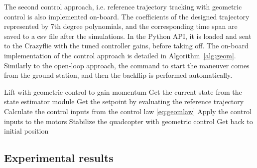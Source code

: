 The second control approach, i.e. reference trajectory tracking with geometric control is also implemented on-board. The coefficients of the designed trajectory represented by 7th degree polynomials, and the corresponding time span are saved to a csv file after the simulations. In the Python API, it is loaded and sent to the Crazyflie with the tuned controller gains, before taking off. The on-board implementation of the control approach is detailed in Algorithm~\ref{alg:geom}. Similarly to the open-loop approach, the command to start the maneuver comes from the ground station, and then the backflip is performed automatically.
\begin{algorithm}
  \cprotect\caption{\verb+performGeomFlip+ on-board implementation}
  \label{alg:geom}
  \begin{algorithmic}[1]
    \State Lift with geometric control to gain momentum
      \State Get the current state from the state estimator module
      \State Get the setpoint by evaluating the reference trajectory
      \State Calculate the control inputs from the control law \eqref{eq:geomlaw}
      \State Apply the control inputs to the motors
    \EndWhile
    \State Stabilize the quadcopter with geometric control
    \State Get back to initial position
  \end{algorithmic}
  \end{algorithm}

\newpage
\subsection{Experimental results}

